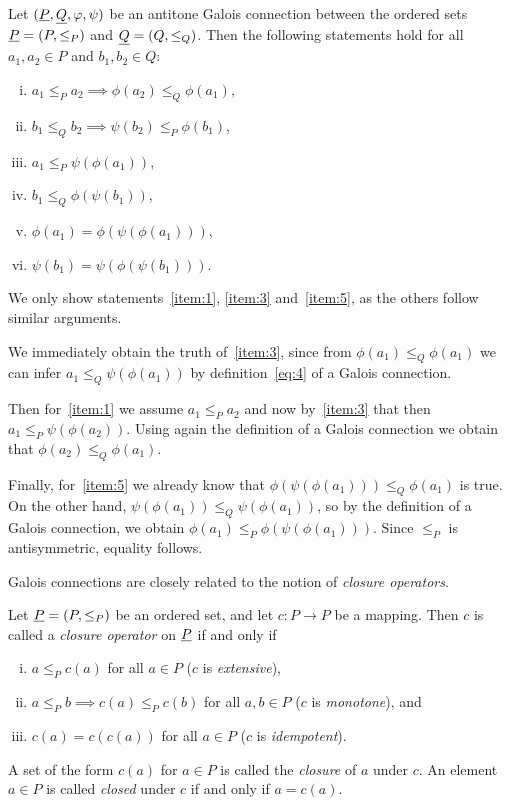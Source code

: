 \begin{Lemma}
  \label{lem:properties-of-galois-connections}
  Let $({\underline{P}}, {\underline{Q}}, \varphi, \psi)$ be an antitone Galois connection between the ordered
  sets ${\underline{P}} = (P, {\leq_P})$ and ${\underline{Q}} = (Q, \leq_Q)$.  Then the following statements
  hold for all $a_1, a_2 \in P$ and $b_1, b_2 \in Q$:
  \begin{enumerate}[i. ]
  \item\label{item:1} $a_1 \leq_P a_2 \implies \phi(a_2) \leq_Q \phi(a_1)$,
  \item\label{item:2} $b_1 \leq_Q b_2 \implies \psi(b_2) \leq_P \phi(b_1)$,
  \item\label{item:3} $a_1 \leq_P \psi(\phi(a_1))$,
  \item\label{item:4} $b_1 \leq_Q \phi(\psi(b_1))$,
  \item\label{item:5} $\phi(a_1) = \phi(\psi(\phi(a_1)))$,
  \item\label{item:6} $\psi(b_1) = \psi(\phi(\psi(b_1)))$.
  \end{enumerate}
\end{Lemma}
\begin{Proof}
  We only show statements~\ref{item:1}, \ref{item:3} and~\ref{item:5}, as the others
  follow similar arguments.

  We immediately obtain the truth of~\ref{item:3}, since from $\phi(a_1) \leq_Q \phi(a_1)$
  we can infer $a_1 \leq_Q \psi(\phi(a_1))$ by definition~\eqref{eq:4} of a Galois
  connection.

  Then for~\ref{item:1} we assume $a_1 \leq_P a_2$ and now by~\ref{item:3} that then $a_1
  \leq_P \psi(\phi(a_2))$.  Using again the definition of a Galois connection we obtain
  that $\phi(a_2) \leq_Q \phi(a_1)$.

  Finally, for~\ref{item:5} we already know that $\phi(\psi(\phi(a_1))) \leq_Q \phi(a_1)$
  is true.  On the other hand, $\psi(\phi(a_1)) \leq_Q \psi(\phi(a_1))$, so by the
  definition of a Galois connection, we obtain $\phi(a_1) \leq_P \phi(\psi(\phi(a_1)))$.
  Since $\leq_P$ is antisymmetric, equality follows.
\end{Proof}

Galois connections are closely related to the notion of \emph{closure operators}.

\begin{Definition}
  \label{def:closure-operator}
  Let ${\underline{P}} = (P, \leq_P)$ be an ordered set, and let $c \colon P \to P$ be a mapping.
  Then $c$ is called a \emph{closure operator} on ${\underline{P}}$ if and only if
  \begin{enumerate}[i. ]
  \item $a \leq_P c(a)$ for all $a \in P$ ($c$ is \emph{extensive}),
  \item $a \leq_P b \implies c(a) \leq_P c(b)$ for all $a, b \in P$ ($c$ is
    \emph{monotone}), and
  \item $c(a) = c(c(a))$ for all $a \in P$ ($c$ is \emph{idempotent}).
  \end{enumerate}
  A set of the form $c(a)$ for $a \in P$ is called the  \emph{closure} of $a$ under $c$.
  An element $a \in P$ is called \emph{closed} under $c$ if and only if $a = c(a)$.
\end{Definition}

